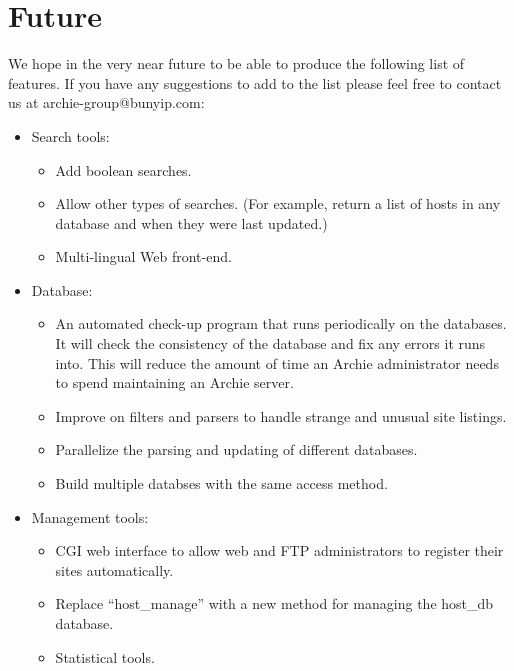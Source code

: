 \section{Future}

We hope in the very near future to be able to produce
the following list of features. If you have any suggestions
to add to the list please feel free to contact us at
archie-group@bunyip.com:

\begin{itemize}
  \item  Search tools:
    \begin{itemize}
      \item Add boolean searches.
      \item Allow other types of searches. (For example, return a
            list of hosts in any database and when they were last updated.)
      \item Multi-lingual Web front-end.
    \end{itemize}
  \item  Database:
    \begin{itemize}
      \item  An automated check-up program that runs periodically on the
             databases.  It will check the consistency of the database and
             fix any errors it runs into.   This will reduce the amount of
             time an Archie administrator needs to spend maintaining an Archie server.
      \item  Improve on filters and parsers to handle strange and unusual site
             listings.
      \item  Parallelize the parsing and updating of different databases.
      \item  Build multiple databses with the same access method.
    \end{itemize}
  \item  Management tools:
    \begin{itemize}
      \item  CGI web interface to allow web and FTP administrators to register
             their sites automatically.
      \item  Replace ``host\_manage'' with a new method for managing the
             host\_db database.
      \item  Statistical tools.
    \end{itemize}
\end{itemize}

